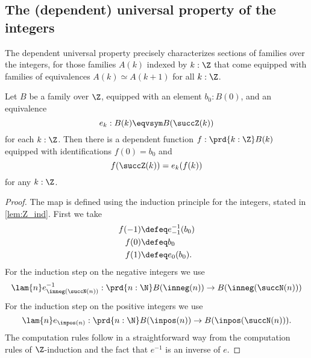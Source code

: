 \subsection{The (dependent) universal property of the integers}

The dependent universal property precisely characterizes sections of families over the integers, for those families $A(k)$ indexed by $k:\Z$ that come equipped with families of equivalences $A(k)\simeq A(k+1)$ for all $k:\Z$.

\begin{lem}\label{lem:elim-Z}
Let $B$ be a family over $\Z$, equipped with an element $b_0:B(0)$, and an equivalence
\begin{equation*}
e_k : B(k)\eqvsym B(\succZ(k))
\end{equation*}
for each $k:\Z$. Then there is a dependent function $f:\prd{k:\Z}B(k)$ equipped with identifications $f(0)=b_0$ and
\begin{equation*}
f(\succZ(k))=e_k(f(k))
\end{equation*}
for any $k:\Z$.
\end{lem}

\begin{proof}
The map is defined using the induction principle for the integers, stated in \cref{lem:Z_ind}. First we take
\begin{align*}
f(-1) & \defeq e_{-1}^{-1}(b_0) \\
f(0) & \defeq b_0 \\
f(1) & \defeq e_0(b_0).
\end{align*}
For the induction step on the negative integers we use
\begin{equation*}
\lam{n}e_{\inneg(\succN(n))}^{-1} : \prd{n:\N} B(\inneg(n))\to B(\inneg(\succN(n)))
\end{equation*}
For the induction step on the positive integers we use
\begin{equation*}
\lam{n}e_{\inpos(n)} : \prd{n:\N} B(\inpos(n))\to B(\inpos(\succN(n))).
\end{equation*}
The computation rules follow in a straightforward way from the computation rules of $\Z$-induction and the fact that $e^{-1}$ is an inverse of $e$. 
\end{proof}

